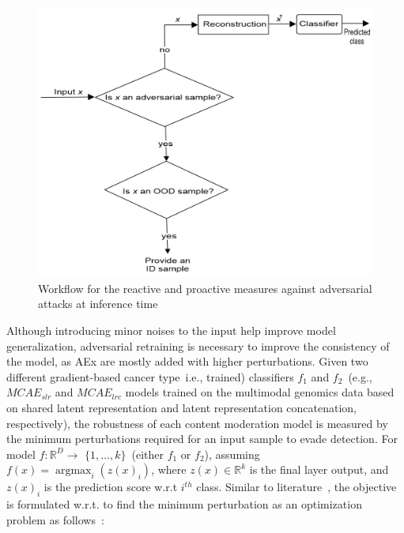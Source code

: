 \begin{figure}[htp!]
    \centering
    \includegraphics[scale=0.75]{images/reactive_measure.png}
    \caption[Reactive and proactive measures in a nutshell against adversarial attacks]{Workflow for the reactive and proactive measures against adversarial attacks at inference time}
    \label{fig:reactive_measures}
\end{figure}

\hspace*{3.5mm} Although introducing minor noises to the input help improve model generalization, adversarial retraining is necessary to improve the consistency of the model, as AEx are mostly added with higher perturbations. Given two different gradient-based cancer type~i.e., trained) classifiers $f_1$ and $f_2$~(e.g., $MCAE_{slr}$ and $MCAE_{lrc}$ models trained on the multimodal genomics data based on shared latent representation and latent representation concatenation, respectively), the robustness of each content moderation model is measured by the minimum perturbations required for an input sample to evade detection. For model $f: \mathbb{R}^{D} \rightarrow$ $\{1, \ldots, k\}$~(either $f_1$ or $f_2$), assuming $f(x)=\operatorname{argmax}_{i}\left(z(x)_{i}\right)$, where $z(x) \in\mathbb{R}^{k}$ is the final layer output, and $z(x)_{i}$ is the prediction score w.r.t $i^{th}$ class. Similar to literature~\cite{bhatt2020explainable}, the objective is formulated w.r.t. to find the minimum perturbation as an optimization problem as follows~\cite{bhatt2020explainable}:


